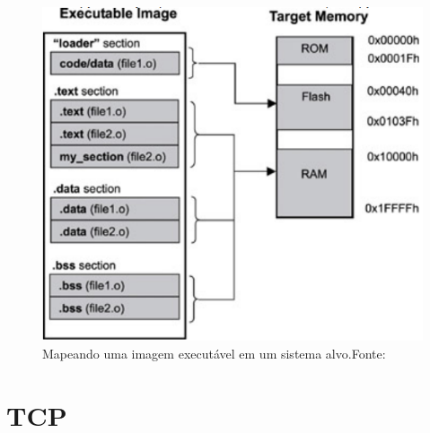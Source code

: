 \begin{figure}[H]
    \scriptsize
     \centering
     \includegraphics[scale=0.7]{dados/figuras/Linker4.png}
     \caption{Mapeando uma imagem executável em um sistema alvo.\newline Fonte:\cite{Qing2003}}
     \label{linker}
\end{figure}









\section{TCP}

